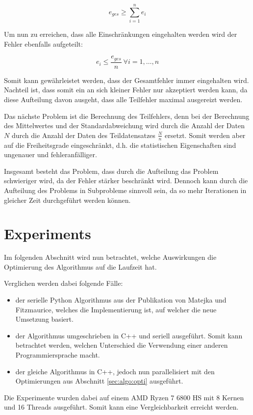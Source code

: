 \documentclass[sigconf]{acmart}
\begin{document}
$$
e_{ges} \geq \sum_{i=1}^{n} e_i
$$

Um nun zu erreichen, dass alle Einschränkungen eingehalten werden wird der Fehler ebenfalls aufgeteilt:

$$
e_i \leq \frac{e_{ges}}{n} ~ \forall i = 1, \dots, n
$$

Somit kann gewährleistet werden, dass der Gesamtfehler immer eingehalten wird. Nachteil ist, dass somit ein an sich kleiner Fehler nur akzeptiert werden kann, da diese Aufteilung davon ausgeht, dass alle Teilfehler maximal ausgereizt werden. 

Das nächste Problem ist die Berechnung des Teilfehlers, denn bei der Berechnung des Mittelwertes und der Standardabweichung wird durch die Anzahl der Daten $N$ durch die Anzahl der Daten des Teildatensatzes $\frac N n$ ersetzt. Somit werden aber auf die Freiheitsgrade eingeschränkt, d.h. die statistischen Eigenschaften sind ungenauer und fehleranfälliger.

Insgesamt besteht das Problem, dass durch die Aufteilung das Problem schwieriger wird, da der Fehler stärker beschränkt wird. Dennoch kann durch die Aufteilung des Problems in Subprobleme sinnvoll sein, da so mehr Iterationen in gleicher Zeit durchgeführt werden können.


\section{Experiments}\label{sec:exp}

Im folgenden Abschnitt wird nun betrachtet, welche Auswirkungen die Optimierung des Algorithmus auf die Laufzeit hat. 

Verglichen werden dabei folgende Fälle:

\begin{itemize}
  \item der serielle Python Algorithmus aus der Publikation von Matejka und Fitzmaurice\cite{matejka2017same}, welches die Implementierung ist, auf welcher die neue Umsetzung basiert. 
  \item der Algorithmus umgeschrieben in C++ und seriell ausgeführt. Somit kann betrachtet werden, welchen Unterschied die Verwendung einer anderen Programmiersprache macht.
  \item der gleiche Algorithmus in C++, jedoch nun parallelisiert mit den Optimierungen aus Abschnitt \ref{sec:algo:opti} ausgeführt.
\end{itemize}

Die Experimente wurden dabei auf einem AMD Ryzen 7 6800 HS mit 8 Kernen und 16 Threads ausgeführt. Somit kann eine Vergleichbarkeit erreicht werden.
\end{document}
